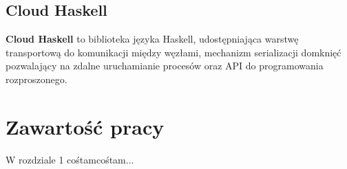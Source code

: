 \subsection{Cloud Haskell}
\label{ssec:cloudHs}
\textbf{Cloud Haskell} to biblioteka języka Haskell, udostępniająca warstwę transportową do komunikacji między węzłami, mechanizm serializacji domknięć pozwalający na zdalne uruchamianie procesów oraz API do programowania rozproszonego.
\section{Zawartość pracy}
\label{sec:zawartoscPracy}
W rozdziale 1 cośtamcośtam...

















